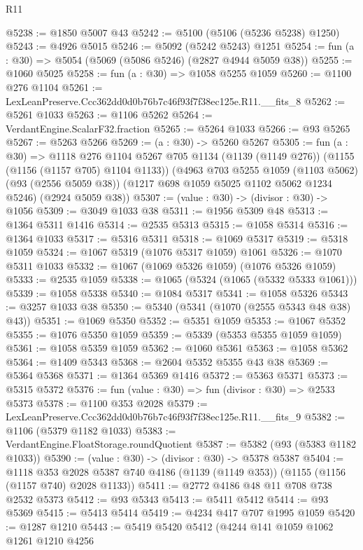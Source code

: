 \begin{lexlean}{R11}
\begin{coremodule}
@5238 := @1850 @5007 @43
@5242 := @5100 (@5106 (@5236 @5238) @1250)
@5243 := @4926 @5015
@5246 := @5092 (@5242 @5243) @1251
@5254 := fun (a : @30) => @5054 (@5069 (@5086 @5246) (@2827 @4944 @5059 @38))
@5255 := @1060 @5025
@5258 := fun (a : @30) => @1058 @5255 @1059
@5260 := @1100 @276 @1104
@5261 := LexLeanPreserve.Ccc362dd0d0b76b7c46f93f7f38ec125e.R11.__fits_8
@5262 := @5261 @1033
@5263 := @1106 @5262
@5264 := VerdantEngine.ScalarF32.fraction
@5265 := @5264 @1033
@5266 := @93 @5265
@5267 := @5263 @5266
@5269 := (a : @30) -> @5260 @5267
@5305 := fun (a : @30) =>
  @1118
    @276
    @1104
    @5267
    @705
    @1134
    (@1139 (@1149 @276))
    (@1155 (@1156 (@1157 @705) @1104 @1133))
    (@4963
      @703
      @5255
      @1059
      (@1103 @5062)
      (@93 (@2556 @5059 @38))
      (@1217 @698 @1059 @5025 @1102 @5062 @1234 @5246)
      (@2924 @5059 @38))
@5307 := (value : @30) -> (divisor : @30) -> @1056
@5309 := @3049 @1033 @38
@5311 := @1956 @5309 @48
@5313 := @1364 @5311 @1416
@5314 := @2535 @5313
@5315 := @1058 @5314
@5316 := @1364 @1033
@5317 := @5316 @5311
@5318 := @1069 @5317
@5319 := @5318 @1059
@5324 := @1067 @5319 (@1076 @5317 @1059) @1061
@5326 := @1070 @5311 @1033
@5332 := @1067 (@1069 @5326 @1059) (@1076 @5326 @1059)
@5333 := @2535 @1059
@5338 := @1065 (@5324 (@1065 (@5332 @5333 @1061)))
@5339 := @1058 @5338
@5340 := @1084 @5317
@5341 := @1058 @5326
@5343 := @3257 @1033 @38
@5350 := @5340 (@5341 (@1070 (@2555 @5343 @48 @38) @43))
@5351 := @1069 @5350
@5352 := @5351 @1059
@5353 := @1067 @5352
@5355 := @1076 @5350 @1059
@5359 := @5339 (@5353 @5355 @1059 @1059)
@5361 := @1058 @5359 @1059
@5362 := @1060 @5361
@5363 := @1058 @5362
@5364 := @1409 @5343
@5368 := @2604 @5352 @5355 @43 @38
@5369 := @5364 @5368
@5371 := @1364 @5369 @1416
@5372 := @5363 @5371
@5373 := @5315 @5372
@5376 := fun (value : @30) => fun (divisor : @30) => @2533 @5373
@5378 := @1100 @353 @2028
@5379 := LexLeanPreserve.Ccc362dd0d0b76b7c46f93f7f38ec125e.R11.__fits_9
@5382 := @1106 (@5379 @1182 @1033)
@5383 := VerdantEngine.FloatStorage.roundQuotient
@5387 := @5382 (@93 (@5383 @1182 @1033))
@5390 := (value : @30) -> (divisor : @30) -> @5378 @5387
@5404 := @1118
    @353
    @2028
    @5387
    @740
    @4186
    (@1139 (@1149 @353))
    (@1155 (@1156 (@1157 @740) @2028 @1133))
@5411 := @2772 @4186 @48 @11 @708 @738 @2532 @5373
@5412 := @93 @5343
@5413 := @5411 @5412
@5414 := @93 @5369
@5415 := @5413 @5414
@5419 := @4234 @417 @707 @1995 @1059
@5420 := @1287 @1210
@5443 := @5419
    @5420
    @5412
    (@4244
      @141
      @1059
      @1062
      @1261
      @1210
      @4256

\end{coremodule}
\end{lexlean}
